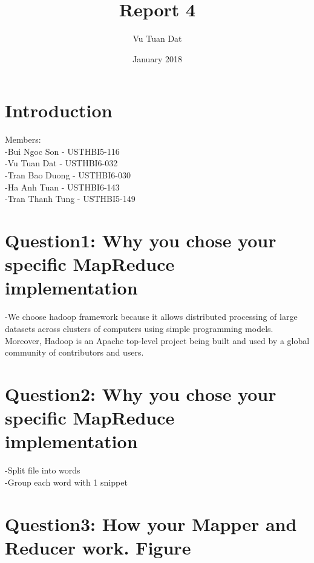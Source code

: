 \documentclass{article}
\title{Report 4}
\author{Vu Tuan Dat }
\date{January 2018}
\begin{document}
\maketitle

\section{Introduction}

Members:\\-Bui Ngoc Son - USTHBI5-116\\-Vu Tuan Dat - USTHBI6-032\\-Tran Bao Duong - USTHBI6-030\\-Ha Anh Tuan - USTHBI6-143\\-Tran Thanh Tung - USTHBI5-149
\section{Question1: Why you chose your specific MapReduce implementation}
-We choose hadoop framework because it allows distributed processing of large datasets across clusters of computers using simple programming models. Moreover, Hadoop is an Apache top-level project being built and used by a global community of contributors and users.

\section{Question2: Why you chose your specific MapReduce implementation}
-Split file into words\\
-Group each word with 1 snippet
\section{Question3: How your Mapper and Reducer work. Figure}
\end{document}
